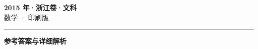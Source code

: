 \documentclass[zihao=5, a4paper]{ctexart}
\begin{document}
\begin{center}
  {\Large\bfseries 2015 年·浙江卷·文科}\\[4pt]
  {\large 数学 · 印刷版}
\end{center}
\medskip
{}

\par\bigskip\hrule\bigskip
{}
\begin{center}{\large\bfseries 参考答案与详细解析}\end{center}
\smallskip

\end{document}
